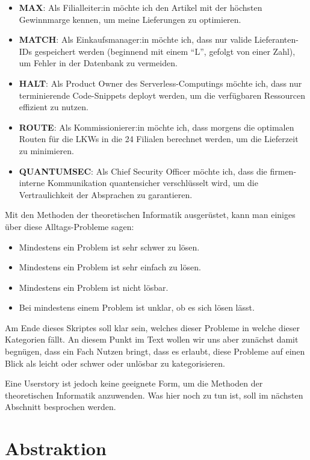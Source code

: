 \begin{itemize}
    \item \textbf{MAX}: Als Filialleiter:in möchte ich den Artikel mit der höchsten Gewinnmarge
        kennen, um meine Lieferungen zu optimieren.
    \item \textbf{MATCH}: Als Einkaufsmanager:in möchte ich,
        dass nur valide Lieferanten-IDs gespeichert werden
        (beginnend mit einem ``L'', gefolgt von einer Zahl),
        um Fehler in der Datenbank zu vermeiden.
    \item \textbf{HALT}: Als Product Owner des Serverless-Computings möchte ich,
        dass nur terminierende Code-Snippets deployt werden,
        um die verfügbaren Ressourcen effizient zu nutzen.
    \item \textbf{ROUTE}: Als Kommissionierer:in möchte ich,
        dass morgens die optimalen Routen für die LKWs in die 24 Filialen berechnet werden,
        um die Lieferzeit zu minimieren.
    \item \textbf{QUANTUMSEC}: Als Chief Security Officer möchte ich,
        dass die firmen-interne Kommunikation quantensicher verschlüsselt wird,
        um die Vertraulichkeit der Absprachen zu garantieren.
\end{itemize}

Mit den Methoden der theoretischen Informatik ausgerüstet,
kann man einiges über diese Alltags-Probleme sagen:
\begin{itemize}
    \item Mindestens ein Problem ist sehr schwer zu lösen.
    \item Mindestens ein Problem ist sehr einfach zu lösen.
    \item Mindestens ein Problem ist nicht lösbar.
    \item Bei mindestens einem Problem ist unklar, ob es sich lösen lässt.
\end{itemize}

Am Ende dieses Skriptes soll klar sein, welches dieser Probleme in welche dieser Kategorien fällt.
An diesem Punkt im Text wollen wir uns aber zunächst damit begnügen,
dass ein Fach Nutzen bringt, dass es erlaubt, diese Probleme auf einen Blick als leicht oder
schwer oder unlösbar zu kategorisieren.

Eine Userstory ist jedoch keine geeignete Form,
um die Methoden der theoretischen Informatik anzuwenden.
Was hier noch zu tun ist, soll im nächsten Abschnitt besprochen werden.

\section{Abstraktion}


